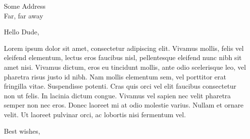 \documentclass[12pt,english]{scrlttr2}
\date{} %
\begin{document}
\raggedright

\begin{letter}{Some Address \\ Far, far away}
  \opening{Hello Dude,}

  Lorem ipsum dolor sit amet, consectetur adipiscing elit. Vivamus mollis, felis vel eleifend elementum, lectus eros faucibus nisl, pellentesque eleifend nunc nibh sit amet nisi. Vivamus dictum, eros eu tincidunt mollis, ante odio scelerisque leo, vel pharetra risus justo id nibh. Nam mollis elementum sem, vel porttitor erat fringilla vitae. Suspendisse potenti. Cras quis orci vel elit faucibus consectetur non ut felis. In lacinia dictum congue. Vivamus vel sapien nec velit pharetra semper non nec eros. Donec laoreet mi at odio molestie varius. Nullam et ornare velit. Ut laoreet pulvinar orci, ac lobortis nisi fermentum vel.


  \closing{Best wishes,}
\end{letter}
\end{document}
